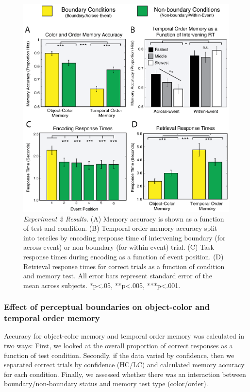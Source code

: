 \begin{figure}
  \centering
  \includegraphics[width=\textwidth]{figures/chapter1_figure3.eps}
  \caption[Behavioral Experiment 2 Results]{\textit{Experiment 2 Results.} (A) Memory accuracy is shown as a function of test and condition. (B) Temporal order memory accuracy split into terciles by encoding response time of intervening boundary (for across-event) or non-boundary (for within-event) trial.  (C) Task response times during encoding as a function of event position. (D) Retrieval response times for correct trials as a function of condition and memory test. All error bars represent standard error of the mean across subjects.  *p<.05, **p<.005, ***p<.001. }
  \label{chapter1_figure3}
\end{figure}

\subsubsection{Effect of perceptual boundaries on object-color and
temporal order
memory}\label{effect-of-perceptual-boundaries-on-object-color-and-temporal-order-memory}

Accuracy for object-color memory and temporal order memory was
calculated in two ways: First, we looked at the overall proportion of
correct responses as a function of test condition. Secondly, if the data
varied by confidence, then we separated correct trials by confidence
(HC/LC) and calculated memory accuracy for each condition. Finally, we
assessed whether there was an interaction between boundary/non-boundary
status and memory test type (color/order).

